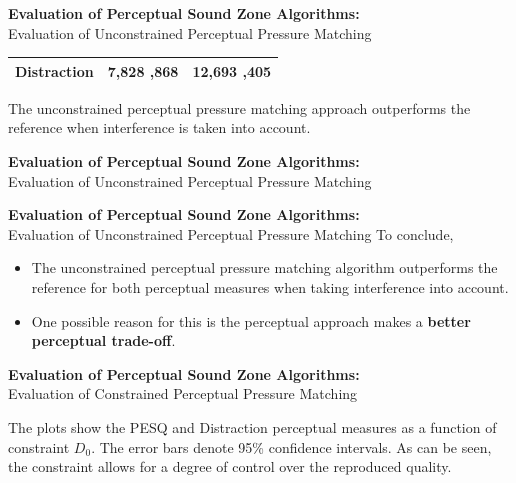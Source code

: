 \documentclass[aspectratio=169]{beamer}
\begin{document}
\begin{frame}{\textbf{Evaluation of Perceptual Sound Zone Algorithms:}\\ Evaluation of Unconstrained
    Perceptual Pressure Matching}
\begin{table}[]
\begin{tabular}{lS[round-mode=places]S[round-mode=places]}
        Distraction                 & 7,828                  ,868              & 12,693                ,405                              \\ 
        \bottomrule
    \end{tabular}
    \end{table}
    The unconstrained perceptual pressure matching approach outperforms the reference when interference is taken into account.
\end{frame}

\begin{frame}{\textbf{Evaluation of Perceptual Sound Zone Algorithms:}\\ Evaluation of Unconstrained
    Perceptual Pressure Matching}
    \begin{figure}[]
        \centering
        \scalebox{0.55}{}
    \end{figure}
\end{frame}

\begin{frame}{\textbf{Evaluation of Perceptual Sound Zone Algorithms:}\\ Evaluation of Unconstrained
    Perceptual Pressure Matching}
    To conclude, 
    \begin{itemize}
        \item The unconstrained perceptual pressure matching algorithm outperforms the reference for both perceptual measures when taking interference
            into account.
        \item One possible reason for this is the perceptual approach makes a \textbf{better perceptual trade-off}.
    \end{itemize}
\end{frame}

\begin{frame}{\textbf{Evaluation of Perceptual Sound Zone Algorithms:}\\ Evaluation of Constrained
    Perceptual Pressure Matching}
    \begin{figure}[]
        \centering
        \scalebox{0.75}{}
    \end{figure}
    The plots show the PESQ and Distraction perceptual measures as a function of constraint $D_0$. 
    The error bars denote 95\% confidence intervals.
    As can be seen, the constraint allows for a degree of control over the reproduced quality.
\end{frame}
\end{document}
